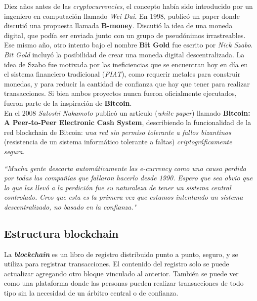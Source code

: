Diez años antes de las \textit{cryptocurrencies}, el concepto había sido introducido por un ingeniero en computación llamado \textit{Wei Dai}. En 1998, publicó un paper donde discutió una propuesta llamada \textbf{B-money}. Discutió la idea de una moneda digital, que podía ser enviada junto con un grupo de pseudónimos irrastreables. Ese mismo año, otro intento bajo el nombre \textbf{Bit Gold} fue escrito por \textit{Nick Szabo}. \textit{Bit Gold} incluyó la posibilidad de crear una moneda digital descentralizada. La idea de Szabo fue motivada por las ineficiencias que se encuentran hoy en día en el sistema financiero tradicional (\textit{FIAT}), como requerir metales para construir monedas, y para reducir la cantidad de confianza que hay que tener para realizar transacciones. Si bien ambos proyectos nunca fueron oficialmente ejecutados, fueron parte de la inspiración de \textbf{Bitcoin}\cite{narayanan2016bitcoin}.\\

En el 2008 \textit{Satoshi Nakamoto} publicó un artículo (\textit{white paper}) llamado \textbf{Bitcoin: A Peer-to-Peer Electronic Cash System}, describiendo la funcionalidad de la red blockchain de Bitcoin: \textit{una red sin permiso tolerante a fallos bizantinos} (resistencia de un sistema informático tolerante a faltas) \textit{criptográficamente segura}.\\

\begin{displayquote}
    \textit{``Mucha gente descarta automáticamente las e-currency como una causa perdida por todas las compañías que fallaron hacerlo desde 1990. Espero que sea obvio que lo que las llevó a la perdición fue su naturaleza de tener un sistema central controlado. Creo que esta es la primera vez que estamos intentando un sistema descentralizado, no basado en la confianza."}
\end{displayquote}

\subsection{Estructura blockchain}
La \textit{\textbf{blockchain}} es un libro de registro distribuido punto a punto, seguro, y se utiliza para registrar transacciones. El contenido del registro solo se puede actualizar agregando otro bloque vinculado al anterior. También se puede ver como una plataforma donde las personas pueden realizar transacciones de todo tipo sin la necesidad de un árbitro central o de confianza.\\

